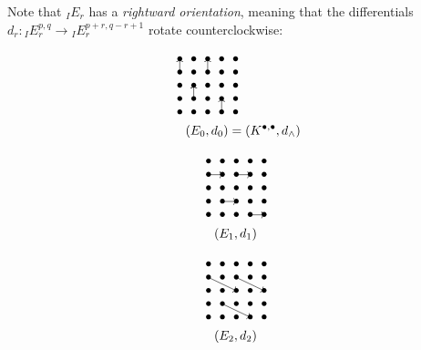 \documentclass[../main.tex]{subfiles}
\begin{document}
\begin{rem} \label{spseqorientation}
    Note that ${}_IE_r$ has a \emph{rightward orientation}, meaning that the differentials $d_r \colon {}_IE_r^{p,q} \to {}_IE_r^{p+r,q-r+1} $ rotate counterclockwise:

 
\begin{minipage}{0.3\textwidth}
\begin{align*}
&\xymatrix@=0pt{
 \ar@{<-}[]+C;[d]+C\bullet & \bullet & \ar@{<-}[]+C;[d]+C\bullet & \bullet & \bullet \\
 \bullet & \bullet & \bullet & \bullet & \bullet \\
 \bullet & \ar@{<-}[]+C;[d]+C\bullet & \bullet & \bullet & \bullet \\
 \bullet & \bullet & \bullet & \ar@{<-}[]+C;[d]+C\bullet & \bullet \\
 \bullet & \bullet & \bullet & \bullet & \bullet \\
}\\
&\hspace{10pt}(E_0,d_0)=(K^{\bullet,\bullet},d_\wedge)
\end{align*}
\end{minipage}
\begin{minipage}{0.3\textwidth}
\begin{align*}
&\xymatrix@=0pt{
 \bullet & \bullet & \bullet & \bullet & \bullet \\
 \bullet & \ar@{<-}[]+C;[l]+C\bullet & \bullet & \ar@{<-}[]+C;[l]+C\bullet & \bullet \\
 \bullet & \bullet & \bullet & \bullet & \bullet \\
 \bullet & \bullet & \ar@{<-}[]+C;[l]+C\bullet & \bullet & \bullet \\
 \bullet & \bullet & \bullet & \bullet & \ar@{<-}[]+C;[l]+C\bullet \\
}\\
&\hspace{10pt}(E_1,d_1)
\end{align*}
\end{minipage}
\begin{minipage}{0.3\textwidth}
\begin{align*}
&\xymatrix@=0pt{
 \bullet & \bullet & \bullet & \bullet & \bullet \\
 \bullet & \bullet & \bullet & \bullet & \bullet \\
 \bullet & \bullet & \ar@{<-}[]+C;[llu]+C\bullet & \bullet & \ar@{<-}[]+C;[llu]+C\bullet \\
 \bullet & \bullet & \bullet & \bullet & \bullet \\
 \bullet & \bullet & \bullet & \ar@{<-}[]+C;[llu]+C\bullet & \bullet \\
}\\
&\hspace{10pt}(E_2,d_2)
\end{align*}
\end{minipage}


\end{rem}
\end{document}
